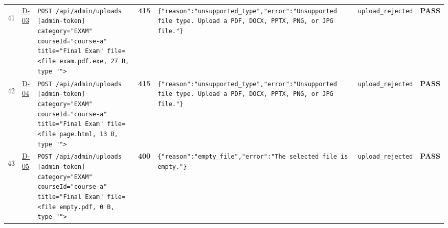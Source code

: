 \documentclass[10pt,a4paper]{article}
\begin{document}
\begin{landscape}
\begin{longtable}{@{}P{0.6cm}P{0.9cm}P{8.5cm}P{1.0cm}P{6.2cm}P{4.2cm}P{1.1cm}@{}}
\hypertarget{call41}{41} & \hyperlink{test-D-03}{D-03} & \texttt{POST /\allowbreak{}api/\allowbreak{}admin/\allowbreak{}uploads [admin-\allowbreak{}token] category=\allowbreak{}"\allowbreak{}EXAM"\allowbreak{} courseId=\allowbreak{}"\allowbreak{}course-\allowbreak{}a"\allowbreak{} title=\allowbreak{}"\allowbreak{}Final Exam"\allowbreak{} file=\allowbreak{}<file exam.\allowbreak{}pdf.\allowbreak{}exe,\allowbreak{} 27 B,\allowbreak{} type "\allowbreak{}"\allowbreak{}>} & \textcolor{warnamber}{\textbf{415}} & \texttt{\{"\allowbreak{}reason"\allowbreak{}:\allowbreak{}"\allowbreak{}unsupported\_\allowbreak{}type"\allowbreak{},\allowbreak{}"\allowbreak{}error"\allowbreak{}:\allowbreak{}"\allowbreak{}Unsupported file type.\allowbreak{} Upload a PDF,\allowbreak{} DOCX,\allowbreak{} PPTX,\allowbreak{} PNG,\allowbreak{} or JPG file.\allowbreak{}"\allowbreak{}\}} & \texttt{upload\_\allowbreak{}rejected} & \textcolor{passgreen}{\textbf{PASS}} \\
\hypertarget{call42}{42} & \hyperlink{test-D-04}{D-04} & \texttt{POST /\allowbreak{}api/\allowbreak{}admin/\allowbreak{}uploads [admin-\allowbreak{}token] category=\allowbreak{}"\allowbreak{}EXAM"\allowbreak{} courseId=\allowbreak{}"\allowbreak{}course-\allowbreak{}a"\allowbreak{} title=\allowbreak{}"\allowbreak{}Final Exam"\allowbreak{} file=\allowbreak{}<file page.\allowbreak{}html,\allowbreak{} 13 B,\allowbreak{} type "\allowbreak{}"\allowbreak{}>} & \textcolor{warnamber}{\textbf{415}} & \texttt{\{"\allowbreak{}reason"\allowbreak{}:\allowbreak{}"\allowbreak{}unsupported\_\allowbreak{}type"\allowbreak{},\allowbreak{}"\allowbreak{}error"\allowbreak{}:\allowbreak{}"\allowbreak{}Unsupported file type.\allowbreak{} Upload a PDF,\allowbreak{} DOCX,\allowbreak{} PPTX,\allowbreak{} PNG,\allowbreak{} or JPG file.\allowbreak{}"\allowbreak{}\}} & \texttt{upload\_\allowbreak{}rejected} & \textcolor{passgreen}{\textbf{PASS}} \\
\hypertarget{call43}{43} & \hyperlink{test-D-05}{D-05} & \texttt{POST /\allowbreak{}api/\allowbreak{}admin/\allowbreak{}uploads [admin-\allowbreak{}token] category=\allowbreak{}"\allowbreak{}EXAM"\allowbreak{} courseId=\allowbreak{}"\allowbreak{}course-\allowbreak{}a"\allowbreak{} title=\allowbreak{}"\allowbreak{}Final Exam"\allowbreak{} file=\allowbreak{}<file empty.\allowbreak{}pdf,\allowbreak{} 0 B,\allowbreak{} type "\allowbreak{}"\allowbreak{}>} & \textcolor{warnamber}{\textbf{400}} & \texttt{\{"\allowbreak{}reason"\allowbreak{}:\allowbreak{}"\allowbreak{}empty\_\allowbreak{}file"\allowbreak{},\allowbreak{}"\allowbreak{}error"\allowbreak{}:\allowbreak{}"\allowbreak{}The selected file is empty.\allowbreak{}"\allowbreak{}\}} & \texttt{upload\_\allowbreak{}rejected} & \textcolor{passgreen}{\textbf{PASS}} \\

\end{longtable}
\end{landscape}
\end{document}
